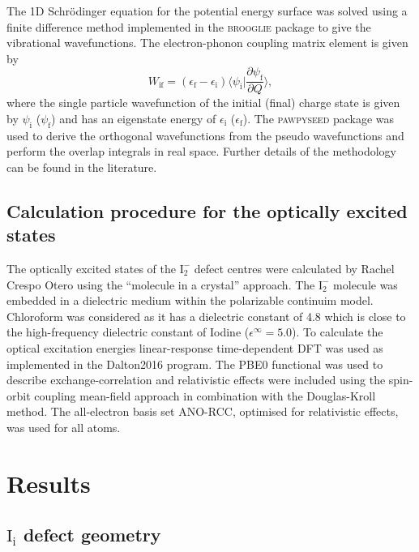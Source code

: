 The 1D Schr\"{o}dinger equation for the potential energy surface was solved using a finite difference method implemented in the \textsc{brooglie} package\autocite{brooglie} to give the vibrational wavefunctions. 
The electron-phonon coupling matrix element is given by
\begin{equation} \label{epcouplingterm}
    W_\textrm{if} = (\epsilon_\textrm{f}-\epsilon_\textrm{i})\langle\psi_\textrm{i}|\frac{\partial\psi_\textrm{f}}{\partial Q}\rangle,
\end{equation}
where the single particle wavefunction of the initial (final) charge state is given by $\psi_\textrm{i}$ ($\psi_\textrm{f}$) and has an eigenstate energy of $\epsilon_\textrm{i}$ ($\epsilon_\textrm{f}$). The \textsc{pawpyseed} package\autocite{pawpyseed} was used to derive the orthogonal wavefunctions from the pseudo wavefunctions and perform the overlap integrals in real space.
Further details of the methodology can be found in the literature.\autocite{Alkauskas2014} 

\subsection{Calculation procedure for the optically excited states}

The optically excited states of the $\mathrm{I}_2^-$ defect centres were calculated by Rachel Crespo Otero using the ``molecule in a crystal'' approach. The $\mathrm{I}_2^-$ molecule was embedded in a dielectric medium within the polarizable continuim model. Chloroform was considered as it has a dielectric constant of 4.8 which is close to the high-frequency dielectric constant of Iodine ($\epsilon^\infty=5.0$)\autocite{Leguy2016b}.
To calculate the optical excitation energies linear-response time-dependent DFT was used as implemented in the Dalton2016 program.\autocite{Aidas2014} The PBE0 functional was used to describe exchange-correlation and relativistic effects were included using the spin-orbit coupling mean-field approach in combination with the Douglas-Kroll method.\autocite{Douglas1974}
The all-electron basis set ANO-RCC, optimised for relativistic effects, was used for all atoms.

\section{Results} \label{ch:6-results}

\subsection{$\mathrm{I}_\mathrm{i}$ defect geometry}

